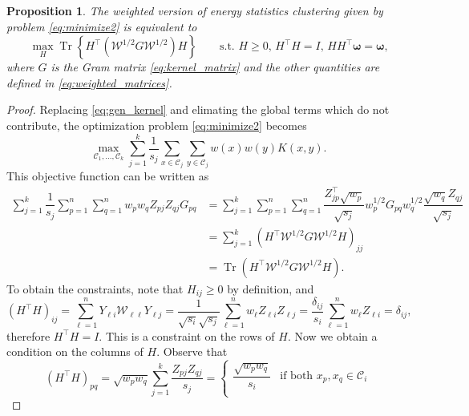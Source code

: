 \documentclass[aps,preprint,nofootinbib,floatfix]{revtex4-1}
\newtheorem{proposition}[theorem]{Proposition}
\DeclareMathOperator{\Tr}{Tr}
\newcommand\kk{K}
\newcommand\C{{\mathcal{C}}}
\begin{document}
\begin{proposition}
\label{th:qcqp3}
The weighted version of energy statistics clustering given by
problem \eqref{eq:minimize2} is equivalent to
\begin{equation}
\label{eq:qcqp3}
\max_H \Tr \left\{ H^\top (\mathcal{W}^{1/2} G \mathcal{W}^{1/2}) H  \right\}
\qquad \mbox{s.t. $H \ge 0$, $H^\top H = I$, $H H^\top \bm{\omega} =
\bm{\omega}$,}
\end{equation}
where $G$ is the Gram matrix \eqref{eq:kernel_matrix} and the other quantities
are defined in 
\eqref{eq:weighted_matrices}.
\end{proposition}
\begin{proof}
Replacing \eqref{eq:gen_kernel} and elimating the global terms which 
do not contribute, the optimization problem \eqref{eq:minimize2}
becomes 
\begin{equation}
\max_{\C_1,\dotsc,\C_k} \sum_{j=1}^k \dfrac{1}{s_j}
\sum_{x\in\C_j}\sum_{y\in\C_j} w(x)w(y) \kk(x,y) . 
\end{equation}
This 
objective function can be written as
\begin{equation}
\begin{split}
\sum_{j=1}^k \dfrac{1}{s_j} 
\sum_{p=1}^n \sum_{q=1}^n 
w_p w_q Z_{pj} Z_{qj} G_{pq} &= 
\sum_{j=1}^k 
\sum_{p=1}^n \sum_{q=1}^n 
\dfrac{Z^\top_{jp}\sqrt{w_p}}{\sqrt{s_j}} w_p^{1/2} G_{pq} w_q^{1/2} 
\dfrac{\sqrt{w_q} Z_{qj}}{\sqrt{s_j}} \\
&= 
\sum_{j=1}^k \left(H^\top \mathcal{W}^{1/2} G \mathcal{W}^{1/2} H\right)_{jj}
\\
&= \Tr\left( H^\top \mathcal{W}^{1/2} G \mathcal{W}^{1/2} H  \right).
\end{split}
\end{equation}
To obtain the constraints, note that $H_{ij} \ge 0$ by definition, and
\begin{equation}
(H^\top H)_{ij} = \sum_{\ell=1}^n 
Y_{\ell i} \mathcal{W}_{\ell \ell} Y_{\ell j } = 
\dfrac{1}{\sqrt{s_i}\sqrt{s_j}} \sum_{\ell=1}^n w_\ell Z_{\ell i} Z_{\ell j}
= \dfrac{\delta_{ij}}{s_i} \sum_{\ell=1}^n w_\ell Z_{\ell i} = \delta_{ij},
\end{equation}
therefore $H^\top H = I$. This is a constraint on the rows of $H$.
Now we obtain a condition on the columns
of $H$. Observe that
\begin{equation}
\left(H^\top H\right)_{pq} = \sqrt{w_p w_q}\sum_{j=1}^k \dfrac{Z_{pj}
Z_{qj}}{s_j} = \begin{cases}
\dfrac{\sqrt{w_p w_q}}{s_i} & \mbox{if both $x_p,x_q \in \C_i$} \\

\end{cases}
\end{equation}
\end{proof}
\end{document}
